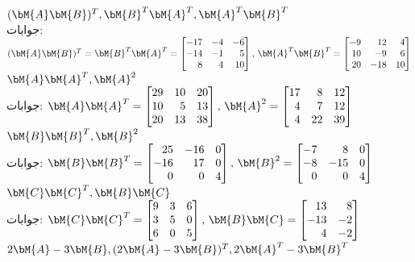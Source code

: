 \quad
$(\bM{A}\bM{B})^T, \bM{B}^T\bM{A}^T, \bM{A}^T\bM{B}^T$\\
جوابات:
$(\bM{A}\bM{B})^T=\bM{B}^T\bM{A}^T=\begin{bmatrix*}[r] -17&-4&-6\\-14&-1&5\\8&4&10 \end{bmatrix*},\, \bM{A}^T\bM{B}^T=\begin{bmatrix*}[r] -9&12&4\\10&-9&6\\20&-18&10 \end{bmatrix*}$
\quad
$\bM{A}\bM{A}^T, \bM{A}^2$\\
جوابات:
$\bM{A}\bM{A}^T=\begin{bmatrix*}[r] 29&10&20\\10&5&13\\20&13&38 \end{bmatrix*}, \, \bM{A}^2=\begin{bmatrix*}[r] 17&8&12\\4&7&12\\4&22&39 \end{bmatrix*}$
\quad
$\bM{B}\bM{B}^T, \bM{B}^2$\\
جوابات:
$\bM{B}\bM{B}^T=\begin{bmatrix*}[r] 25&-16&0\\-16&17&0\\0&0&4 \end{bmatrix*}, \, \bM{B}^2=\begin{bmatrix*}[r]-7&8&0\\-8&-15&0\\0&0&4  \end{bmatrix*}$
\quad
$\bM{C}\bM{C}^T, \bM{B}\bM{C}$\\
جوابات:
$\bM{C}\bM{C}^T=\begin{bmatrix*}[r]9&3&6\\3&5&0\\6&0&5  \end{bmatrix*},\, \bM{B}\bM{C}=\begin{bmatrix*}[r]13&8\\-13&-2\\4&-2  \end{bmatrix*}$
\quad
$2\bM{A}-3\bM{B}, (2\bM{A}-3\bM{B})^T, 2\bM{A}^T-3\bM{B}^T$\\
